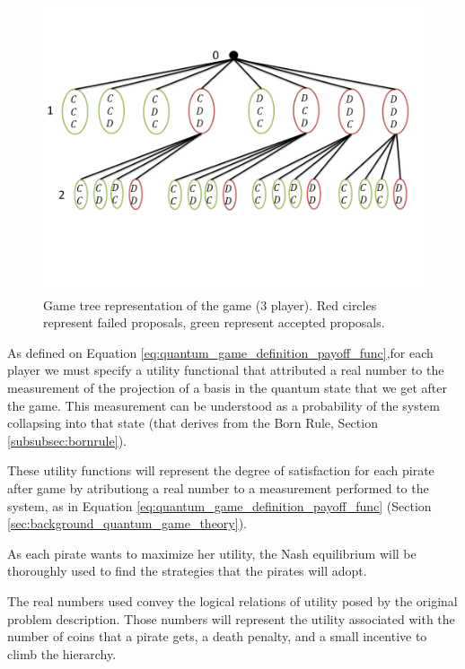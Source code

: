 \begin{figure}[h]
\centering 
\includegraphics[scale=0.55]{Figures/architecture/GameTree/Slide1.png}
\caption{Game tree representation of the game ($3$ player). Red circles represent failed proposals, green represent accepted proposals. }
\label{fig:pg_architecturegametree}
\end{figure}

As defined on Equation \ref{eq:quantum_game_definition_payoff_func},for each player we must specify a utility functional that attributed a real number to the measurement of the projection of a basis in the quantum state that we get after the game. This measurement can be understood as a probability of the system collapsing into that state (that derives from the Born Rule, Section \ref{subsubsec:bornrule}).


These utility functions will represent the degree of satisfaction for each pirate after game by atributiong a real number to a measurement performed to the system, as in Equation \ref{eq:quantum_game_definition_payoff_func} (Section \ref{sec:background_quantum_game_theory}). 

As each pirate wants to maximize her utility, the Nash equilibrium will be thoroughly used to find the strategies that the pirates will adopt\cite{nash50}\cite{Nash51}.

The real numbers used convey the logical relations of utility posed by the original problem description. Those numbers will represent the utility associated with the number of coins that a pirate gets, a death penalty, and a small incentive to climb the hierarchy.

